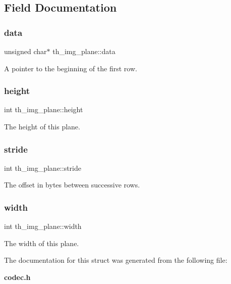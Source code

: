 \subsection{Field Documentation}
\mbox{\label{structth__img__plane_af8133681516ce88b5a201c1b4b7e6ba2}} 
\subsubsection{data}
{\footnotesize\ttfamily unsigned char$\ast$ th\+\_\+img\+\_\+plane\+::data}



A pointer to the beginning of the first row. 

\mbox{\label{structth__img__plane_a21aea1367894468de489d529d7eaf44d}} 
\subsubsection{height}
{\footnotesize\ttfamily int th\+\_\+img\+\_\+plane\+::height}



The height of this plane. 

\mbox{\label{structth__img__plane_ab1100f071ffee3b37e07e3222f819bad}} 
\subsubsection{stride}
{\footnotesize\ttfamily int th\+\_\+img\+\_\+plane\+::stride}



The offset in bytes between successive rows. 

\mbox{\label{structth__img__plane_a58cc297a99cd4594c3d30e56f2ed6b74}} 
\subsubsection{width}
{\footnotesize\ttfamily int th\+\_\+img\+\_\+plane\+::width}



The width of this plane. 



The documentation for this struct was generated from the following file\+:\begin{DoxyCompactItemize}
\item 
\textbf{ codec.\+h}\end{DoxyCompactItemize}
